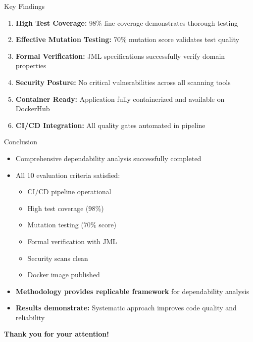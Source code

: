 \documentclass[aspectratio=169]{beamer}
\begin{document}
\begin{frame}{Key Findings}
\begin{enumerate}
    \item \textbf{High Test Coverage:} 98\% line coverage demonstrates thorough testing
    
    \item \textbf{Effective Mutation Testing:} 70\% mutation score validates test quality
    
    \item \textbf{Formal Verification:} JML specifications successfully verify domain properties
    
    \item \textbf{Security Posture:} No critical vulnerabilities across all scanning tools
    
    \item \textbf{Container Ready:} Application fully containerized and available on DockerHub
    
    \item \textbf{CI/CD Integration:} All quality gates automated in pipeline
\end{enumerate}
\end{frame}

\begin{frame}{Conclusion}
\begin{itemize}
    \item Comprehensive dependability analysis successfully completed
    
    \item All 10 evaluation criteria satisfied:
    \begin{itemize}
        \item CI/CD pipeline operational
        \item High test coverage (98\%)
        \item Mutation testing (70\% score)
        \item Formal verification with JML
        \item Security scans clean
        \item Docker image published
    \end{itemize}
    
    \vspace{0.3cm}
    \item \textbf{Methodology provides replicable framework} for dependability analysis
    
    \vspace{0.3cm}
    \item \textbf{Results demonstrate:} Systematic approach improves code quality and reliability
\end{itemize}

\vspace{0.3cm}
\begin{center}
\Large \textbf{Thank you for your attention!}
\end{center}
\end{frame}
\end{document}
